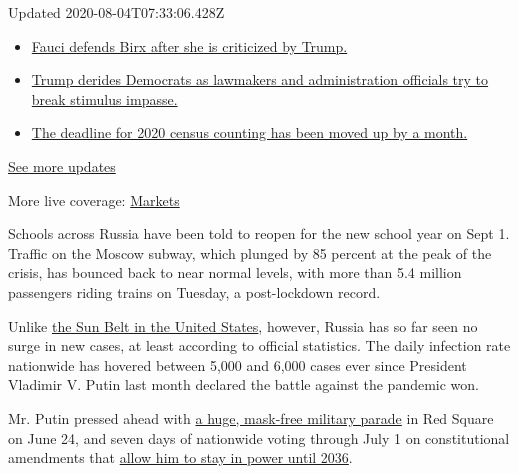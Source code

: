 Updated 2020-08-04T07:33:06.428Z

\begin{itemize}
\tightlist
\item
  \href{https://www.nytimes3xbfgragh.onion/2020/08/03/world/coronavirus-covid-19.html?action=click\&pgtype=Article\&state=default\&region=MAIN_CONTENT_1\&context=storylines_live_updates\#link-4547638f}{Fauci
  defends Birx after she is criticized by Trump.}
\item
  \href{https://www.nytimes3xbfgragh.onion/2020/08/03/world/coronavirus-covid-19.html?action=click\&pgtype=Article\&state=default\&region=MAIN_CONTENT_1\&context=storylines_live_updates\#link-15e7f995}{Trump
  derides Democrats as lawmakers and administration officials try to
  break stimulus impasse.}
\item
  \href{https://www.nytimes3xbfgragh.onion/2020/08/03/world/coronavirus-covid-19.html?action=click\&pgtype=Article\&state=default\&region=MAIN_CONTENT_1\&context=storylines_live_updates\#link-e5a2cda}{The
  deadline for 2020 census counting has been moved up by a month.}
\end{itemize}

\href{https://www.nytimes3xbfgragh.onion/2020/08/03/world/coronavirus-covid-19.html?action=click\&pgtype=Article\&state=default\&region=MAIN_CONTENT_1\&context=storylines_live_updates}{See
more updates}

More live coverage:
\href{https://www.nytimes3xbfgragh.onion/live/2020/08/03/business/stock-market-today-coronavirus?action=click\&pgtype=Article\&state=default\&region=MAIN_CONTENT_1\&context=storylines_live_updates}{Markets}

Schools across Russia have been told to reopen for the new school year
on Sept 1. Traffic on the Moscow subway, which plunged by 85 percent at
the peak of the crisis, has bounced back to near normal levels, with
more than 5.4 million passengers riding trains on Tuesday, a
post-lockdown record.

Unlike
\href{https://www.nytimes3xbfgragh.onion/2020/06/14/us/coronavirus-united-states.html}{the
Sun Belt in the United States}, however, Russia has so far seen no surge
in new cases, at least according to official statistics. The daily
infection rate nationwide has hovered between 5,000 and 6,000 cases ever
since President Vladimir V. Putin last month declared the battle against
the pandemic won.

Mr. Putin pressed ahead with
\href{https://www.nytimes3xbfgragh.onion/2020/06/24/world/europe/russia-coronavirus-parade.html}{a
huge, mask-free military parade} in Red Square on June 24, and seven
days of nationwide voting through July 1 on constitutional amendments
that
\href{https://www.nytimes3xbfgragh.onion/2020/07/01/world/europe/putin-referendum-vote-russia.html}{allow
him to stay in power until 2036}.

